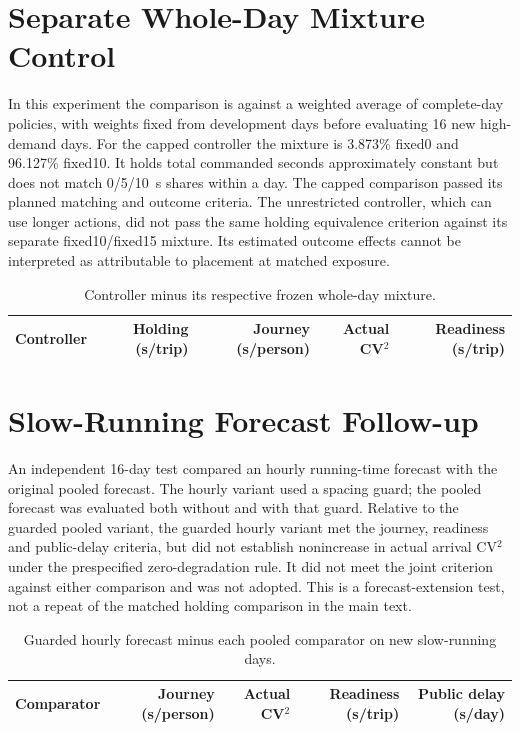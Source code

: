 \documentclass[10pt,journal,onecolumn]{IEEEtran}
\begin{document}
\section{Separate Whole-Day Mixture Control}
In this experiment the comparison is against a weighted average of
complete-day policies, with weights fixed from development days before
evaluating 16 new high-demand days. For the capped controller the mixture
is 3.873\% fixed0 and 96.127\% fixed10. It holds total commanded seconds
approximately constant but does not match 0/5/10~s shares within a day.
The capped comparison passed its planned matching and outcome criteria.
The unrestricted controller, which can use longer actions, did not pass
the same holding equivalence criterion against its separate fixed10/fixed15
mixture. Its estimated outcome effects cannot be interpreted as attributable
to placement at matched exposure.

\begin{table}[!ht]
\centering
\caption{Controller minus its respective frozen whole-day mixture.}
\small
\begin{tabular}{@{}lrrrr@{}}
\toprule
Controller & Holding (s/trip) & Journey (s/person) & Actual CV$^2$ & Readiness (s/trip) \\
\midrule

\end{tabular}
\end{table}

\section{Slow-Running Forecast Follow-up}
An independent 16-day test compared an hourly running-time forecast with
the original pooled forecast. The hourly variant used a spacing guard;
the pooled forecast was evaluated both without and with that guard.
Relative to the guarded pooled variant, the guarded hourly variant met
the journey, readiness and public-delay criteria, but did not establish
nonincrease in actual arrival CV$^2$ under the prespecified zero-degradation
rule. It did not meet the joint criterion against either comparison and
was not adopted. This is a forecast-extension test, not a repeat of the
matched holding comparison in the main text.

\begin{table}[!ht]
\centering
\caption{Guarded hourly forecast minus each pooled comparator on new slow-running days.}
\small
\begin{tabular}{@{}lrrrr@{}}
\toprule
Comparator & Journey (s/person) & Actual CV$^2$ & Readiness (s/trip) & Public delay (s/day) \\
\midrule

\end{tabular}
\end{table}
\end{document}
